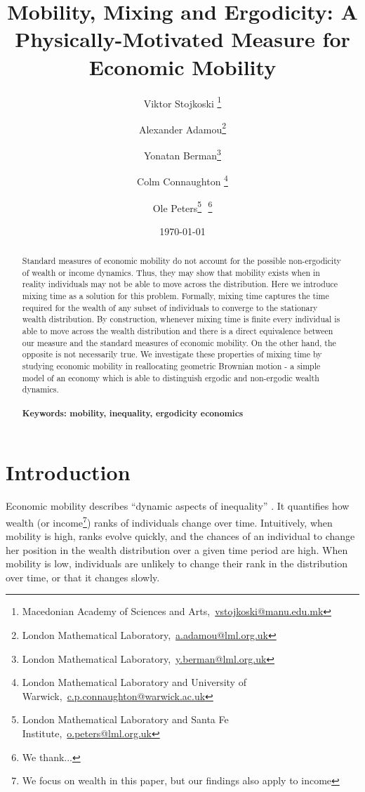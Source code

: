 \documentclass[11pt]{article}
\newcommand{\bc}{\begin{center}}
\newcommand{\ec}{\end{center}}
\newcommand{\red}[1]{{\color{red} #1}}
\numberwithin{equation}{section}
\begin{document}
\begin{titlepage}
\title{Mobility, Mixing and Ergodicity: A Physically-Motivated Measure for Economic Mobility}
\author{Viktor Stojkoski \footnote{Macedonian Academy of Sciences and Arts,~\url{vstojkoski@manu.edu.mk}} \and Alexander Adamou\footnote{London Mathematical Laboratory,~\url{a.adamou@lml.org.uk}} \and Yonatan Berman\footnote{London Mathematical Laboratory,~\url{y.berman@lml.org.uk}} \and Colm Connaughton \footnote{London Mathematical Laboratory and University of Warwick,~\url{c.p.connaughton@warwick.ac.uk}} \and Ole Peters\footnote{London Mathematical Laboratory and Santa Fe Institute,~\url{o.peters@lml.org.uk}}\,\, \thanks{We thank...}}
\date{\today}
\maketitle
\begin{abstract}
\noindent Standard measures of economic mobility do not account for the possible non-ergodicity of wealth or income dynamics. Thus, they may show that mobility exists when in reality individuals may not be able to move across the distribution. Here we introduce mixing time as a solution for this problem. Formally, mixing time captures the time required for the wealth of any subset of individuals to converge to the stationary wealth distribution. By construction, whenever mixing time is finite every individual is able to move across the wealth distribution and there is a direct equivalence between our measure and the standard measures of economic mobility. On the other hand, the opposite is not necessarily true. We investigate these properties of mixing time by studying economic mobility in reallocating geometric Brownian motion - a simple model of an economy which is able to distinguish ergodic and non-ergodic wealth dynamics.
\\
\\
\noindent\textbf{Keywords: mobility, inequality, ergodicity economics}
\end{abstract}
\setcounter{page}{0}
\thispagestyle{empty}
\end{titlepage}
\pagebreak \newpage
\section{Introduction}\label{sec:introduction}
Economic mobility describes ``dynamic aspects of inequality'' \citep{Shorrocks1978}. It quantifies how wealth (or income\footnote{We focus on wealth in this paper, but our findings also apply to income}) ranks of individuals change over time. Intuitively, when mobility is high, ranks evolve quickly, and the chances of an individual to change her position in the wealth distribution over a given time period are high. When mobility is low, individuals are unlikely to change their rank in the distribution over time, or that it changes slowly.
\end{document}
